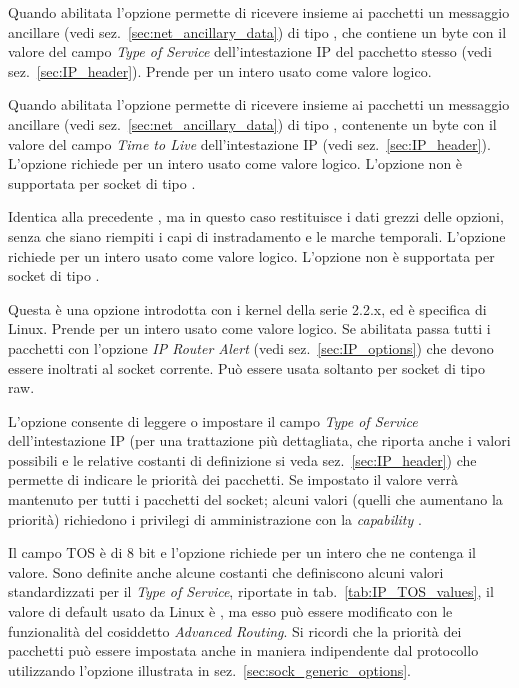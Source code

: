 \begin{basedescript}{\desclabelwidth{2.0cm}\desclabelstyle{\nextlinelabel}}
\item[\constd{IP\_RECVTOS}] Quando abilitata l'opzione permette di ricevere
  insieme ai pacchetti un messaggio ancillare (vedi
  sez.~\ref{sec:net_ancillary_data}) di tipo , che contiene un
  byte con il valore del campo \textit{Type of Service} dell'intestazione IP
  del pacchetto stesso (vedi sez.~\ref{sec:IP_header}).  Prende per
   un intero usato come valore logico.

\item[\constd{IP\_RECVTTL}] Quando abilitata l'opzione permette di ricevere
  insieme ai pacchetti un messaggio ancillare (vedi
  sez.~\ref{sec:net_ancillary_data}) di tipo , contenente
  un byte con il valore del campo \textit{Time to Live} dell'intestazione IP
  (vedi sez.~\ref{sec:IP_header}).  L'opzione richiede per  un
  intero usato come valore logico. L'opzione non è supportata per socket di
  tipo .

\item[\constd{IP\_RETOPTS}] Identica alla precedente , ma
  in questo caso restituisce i dati grezzi delle opzioni, senza che siano
  riempiti i capi di instradamento e le marche temporali.  L'opzione richiede
  per  un intero usato come valore logico.  L'opzione non è
  supportata per socket di tipo .

\item[\constd{IP\_ROUTER\_ALERT}] Questa è una opzione introdotta con i
  kernel della serie 2.2.x, ed è specifica di Linux. Prende per
   un intero usato come valore logico. Se abilitata
  passa tutti i pacchetti con l'opzione \textit{IP Router Alert} (vedi
  sez.~\ref{sec:IP_options}) che devono essere inoltrati al socket
  corrente. Può essere usata soltanto per socket di tipo raw.

\item[\constd{IP\_TOS}] L'opzione consente di leggere o impostare il campo
  \textit{Type of Service} dell'intestazione IP (per una trattazione più
  dettagliata, che riporta anche i valori possibili e le relative costanti di
  definizione si veda sez.~\ref{sec:IP_header}) che permette di indicare le
  priorità dei pacchetti. Se impostato il valore verrà mantenuto per tutti i
  pacchetti del socket; alcuni valori (quelli che aumentano la priorità)
  richiedono i privilegi di amministrazione con la \textit{capability}
  .

  Il campo TOS è di 8 bit e l'opzione richiede per  un intero
  che ne contenga il valore. Sono definite anche alcune costanti che
  definiscono alcuni valori standardizzati per il \textit{Type of Service},
  riportate in tab.~\ref{tab:IP_TOS_values}, il valore di default usato da
  Linux è , ma esso può essere modificato con le
  funzionalità del cosiddetto \textit{Advanced Routing}. Si ricordi che la
  priorità dei pacchetti può essere impostata anche in maniera indipendente
  dal protocollo utilizzando l'opzione  illustrata in
  sez.~\ref{sec:sock_generic_options}.


\end{basedescript}
